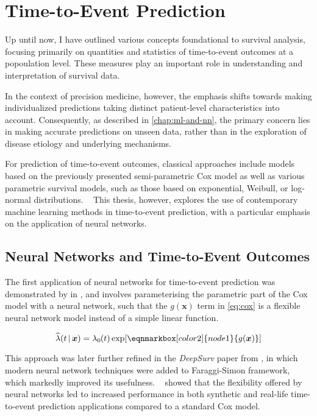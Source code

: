 \section{Time-to-Event Prediction}

Up until now, 
I have outlined various concepts foundational to survival analysis,
focusing primarily on quantities and statistics of time-to-event outcomes
at a popoulation level.
These measures play an important role in understanding 
and interpretation of survival data.

In the context of precision medicine, however,
the emphasis shifts towards making individualized predictions
taking distinct patient-level characteristics into account.
Consequently, as described in \cref{chap:ml-and-nn}, 
the primary concern lies in 
making accurate predictions on unseen data,
rather than in the exploration of disease etiology and underlying mechanisms.

For prediction of time-to-event outcomes, classical approaches 
include models based on the previously presented semi-parametric Cox model 
as well as various parametric survival models, 
such as those based on exponential, Weibull, or log-normal distributions.
~\autocite{kleinSurvival2003}
This thesis, however, 
explores the use of contemporary machine learning methods 
in time-to-event prediction,
with a particular emphasis on the application of neural networks.

\subsection{Neural Networks and Time-to-Event Outcomes}

The first application of neural networks for time-to-event prediction
was demonstrated by
\citeauthor{faraggiNeural1995} in
\citeyear{faraggiNeural1995},
and involves parameterising the parametric part of the Cox model
with a neural network, 
such that the \(g(\bm{x})\) term in \cref{eq:cox} is a 
flexible neural network model instead of a simple linear function.
\autocite{faraggiNeural1995}

\vspace{1em}
\begin{equation*}
    \widehat{\lambda} (t \,|\, \bm{x}) = \hzt \exp [
    \eqnmarkbox[color2]{node1}{
        g(\bm{x})
    }]
\end{equation*}

This approach was later further refined
in the \emph{DeepSurv} paper from 
\citeyear{katzmanDeepSurv2018a},
in which modern neural network techniques
were added to Faraggi-Simon framework, 
which markedly improved its usefulness.
~\autocite{katzmanDeepSurv2018a}
\citeauthor{katzmanDeepSurv2018a} showed that the flexibility 
offered by neural networks led to increased performance
in both synthetic and real-life time-to-event prediction applications
compared to a standard Cox model.
~\autocite{katzmanDeepSurv2018a}







